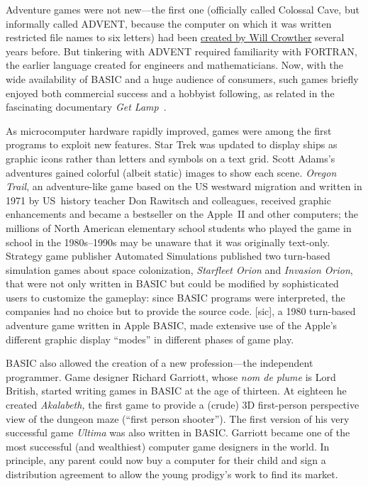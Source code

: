 \begin{tangent}
  Adventure games were not new---the first one (officially called
  Colossal Cave, but informally called ADVENT, because
  the computer on which it was written restricted file names to six letters)
  had been
  \href{https://armandofox.blogspot.com/2007/08/the-original-original-adventure.html}{created
by Will Crowther} several years before.  But tinkering with ADVENT
  required familiarity with
FORTRAN, the earlier language created for engineers and
mathematicians.
Now, with the wide availability of BASIC and a huge audience of
consumers, such games briefly enjoyed both commercial success and a
hobbyist following, as
related in the fascinating documentary \emph{Get
Lamp}~\cite{get_lamp}.
\end{tangent}

As microcomputer hardware rapidly improved,
games were among the first programs to exploit new features.
Star Trek was updated to display ships as graphic icons rather than
letters and symbols on a text grid.
Scott Adams's adventures gained colorful (albeit static) images to
show each scene.
\emph{Oregon Trail}, an adventure-like game based on the US westward
migration and written in 1971 by US~history teacher Don Rawitsch and colleagues,
received graphic enhancements and became
a bestseller on the Apple~II and other computers;
the millions of
North American elementary school students who played the game in school
in the 1980s--1990s
may be unaware that it was originally text-only.
Strategy game publisher
Automated Simulations published two turn-based simulation games about
space colonization,
\emph{Starfleet Orion} and \emph{Invasion Orion}, that were not only
written in BASIC but could be modified by sophisticated users to
customize the gameplay: since BASIC programs were interpreted, the
companies had no choice but to provide the source code.
 [sic], a 1980 turn-based adventure game
written in Apple BASIC,
made extensive use of the Apple's different graphic display ``modes''
in different phases of game play.


BASIC also allowed the creation of a new profession---the independent
programmer.
Game designer Richard Garriott, whose \emph{nom de plume} is Lord
British, started writing games in BASIC at the age of thirteen.
At eighteen he created
\emph{Akalabeth,} the first game to provide a (crude) 3D first-person
perspective view of the dungeon maze (``first person shooter'').
The first version of his very
successful game \emph{Ultima} was also written in BASIC.
Garriott became one of the most successful (and wealthiest)
computer game designers in the world.
In principle, any parent could now buy a computer for their child and
sign a distribution agreement to allow the young prodigy's work to
find its market.

